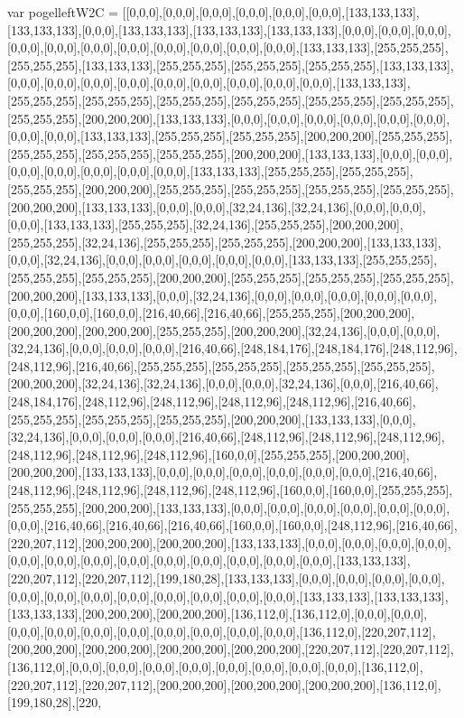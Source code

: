 var pogelleftW2C = [[0,0,0],[0,0,0],[0,0,0],[0,0,0],[0,0,0],[0,0,0],[133,133,133],[133,133,133],[0,0,0],[133,133,133],[133,133,133],[133,133,133],[0,0,0],[0,0,0],[0,0,0],[0,0,0],[0,0,0],[0,0,0],[0,0,0],[0,0,0],[0,0,0],[0,0,0],[0,0,0],[133,133,133],[255,255,255],[255,255,255],[133,133,133],[255,255,255],[255,255,255],[255,255,255],[133,133,133],[0,0,0],[0,0,0],[0,0,0],[0,0,0],[0,0,0],[0,0,0],[0,0,0],[0,0,0],[0,0,0],[133,133,133],[255,255,255],[255,255,255],[255,255,255],[255,255,255],[255,255,255],[255,255,255],[255,255,255],[200,200,200],[133,133,133],[0,0,0],[0,0,0],[0,0,0],[0,0,0],[0,0,0],[0,0,0],[0,0,0],[0,0,0],[133,133,133],[255,255,255],[255,255,255],[200,200,200],[255,255,255],[255,255,255],[255,255,255],[255,255,255],[200,200,200],[133,133,133],[0,0,0],[0,0,0],[0,0,0],[0,0,0],[0,0,0],[0,0,0],[0,0,0],[133,133,133],[255,255,255],[255,255,255],[255,255,255],[200,200,200],[255,255,255],[255,255,255],[255,255,255],[255,255,255],[200,200,200],[133,133,133],[0,0,0],[0,0,0],[32,24,136],[32,24,136],[0,0,0],[0,0,0],[0,0,0],[133,133,133],[255,255,255],[32,24,136],[255,255,255],[200,200,200],[255,255,255],[32,24,136],[255,255,255],[255,255,255],[200,200,200],[133,133,133],[0,0,0],[32,24,136],[0,0,0],[0,0,0],[0,0,0],[0,0,0],[0,0,0],[133,133,133],[255,255,255],[255,255,255],[255,255,255],[200,200,200],[255,255,255],[255,255,255],[255,255,255],[200,200,200],[133,133,133],[0,0,0],[32,24,136],[0,0,0],[0,0,0],[0,0,0],[0,0,0],[0,0,0],[0,0,0],[160,0,0],[160,0,0],[216,40,66],[216,40,66],[255,255,255],[200,200,200],[200,200,200],[200,200,200],[255,255,255],[200,200,200],[32,24,136],[0,0,0],[0,0,0],[32,24,136],[0,0,0],[0,0,0],[0,0,0],[216,40,66],[248,184,176],[248,184,176],[248,112,96],[248,112,96],[216,40,66],[255,255,255],[255,255,255],[255,255,255],[255,255,255],[200,200,200],[32,24,136],[32,24,136],[0,0,0],[0,0,0],[32,24,136],[0,0,0],[216,40,66],[248,184,176],[248,112,96],[248,112,96],[248,112,96],[248,112,96],[216,40,66],[255,255,255],[255,255,255],[255,255,255],[200,200,200],[133,133,133],[0,0,0],[32,24,136],[0,0,0],[0,0,0],[0,0,0],[216,40,66],[248,112,96],[248,112,96],[248,112,96],[248,112,96],[248,112,96],[248,112,96],[160,0,0],[255,255,255],[200,200,200],[200,200,200],[133,133,133],[0,0,0],[0,0,0],[0,0,0],[0,0,0],[0,0,0],[0,0,0],[216,40,66],[248,112,96],[248,112,96],[248,112,96],[248,112,96],[160,0,0],[160,0,0],[255,255,255],[255,255,255],[200,200,200],[133,133,133],[0,0,0],[0,0,0],[0,0,0],[0,0,0],[0,0,0],[0,0,0],[0,0,0],[216,40,66],[216,40,66],[216,40,66],[160,0,0],[160,0,0],[248,112,96],[216,40,66],[220,207,112],[200,200,200],[200,200,200],[133,133,133],[0,0,0],[0,0,0],[0,0,0],[0,0,0],[0,0,0],[0,0,0],[0,0,0],[0,0,0],[0,0,0],[0,0,0],[0,0,0],[0,0,0],[0,0,0],[133,133,133],[220,207,112],[220,207,112],[199,180,28],[133,133,133],[0,0,0],[0,0,0],[0,0,0],[0,0,0],[0,0,0],[0,0,0],[0,0,0],[0,0,0],[0,0,0],[0,0,0],[0,0,0],[0,0,0],[133,133,133],[133,133,133],[133,133,133],[200,200,200],[200,200,200],[136,112,0],[136,112,0],[0,0,0],[0,0,0],[0,0,0],[0,0,0],[0,0,0],[0,0,0],[0,0,0],[0,0,0],[0,0,0],[0,0,0],[136,112,0],[220,207,112],[200,200,200],[200,200,200],[200,200,200],[200,200,200],[220,207,112],[220,207,112],[136,112,0],[0,0,0],[0,0,0],[0,0,0],[0,0,0],[0,0,0],[0,0,0],[0,0,0],[0,0,0],[136,112,0],[220,207,112],[220,207,112],[200,200,200],[200,200,200],[200,200,200],[136,112,0],[199,180,28],[220,